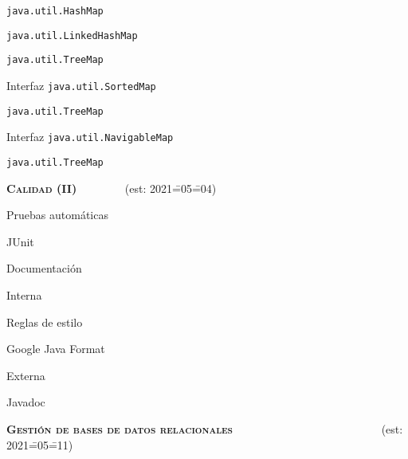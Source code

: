 \begin{longenum}
\begin{longenum}
\begin{longenum}
            \begin{longenum}
                \item \texttt{java.util.HashMap}
                \item \texttt{java.util.LinkedHashMap}
                \item \texttt{java.util.TreeMap}
            \end{longenum}
            \item Interfaz \texttt{java.util.SortedMap}
            \begin{longenum}
                \item \texttt{java.util.TreeMap}
            \end{longenum}
            \item Interfaz \texttt{java.util.NavigableMap}
            \begin{longenum}
                \item \texttt{java.util.TreeMap}
            \end{longenum}
        \end{longenum}
    \end{longenum}
    \item \textbf{\textsc{Calidad (II)}} \ \ \ \ \ \ \ \ (est: 2021\==05\==04)
    \begin{longenum}
        \item Pruebas automáticas
        \begin{longenum}
            \item JUnit
        \end{longenum}
        \item Documentación
        \begin{longenum}
            \item Interna
            \begin{longenum}
                \item Reglas de estilo
                \item Google Java Format
            \end{longenum}
            \item Externa
            \begin{longenum}
                \item Javadoc
            \end{longenum}
        \end{longenum}
    \end{longenum}
    \item \textbf{\textsc{Gestión de bases de datos relacionales}} \ \ \ \ \ \ \ \ \ \ \ \ \ \ \ \ \ \ \ \ \ \ \ \ \ \ (est: 2021\==05\==11)

\end{longenum}
